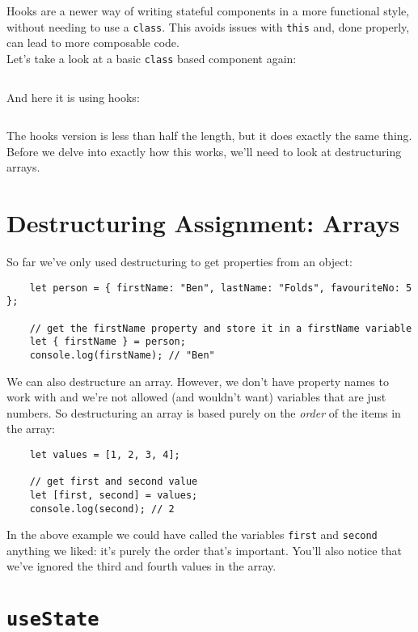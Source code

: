 Hooks are a newer way of writing stateful components in a more functional style, without needing to use a \texttt{class}. This avoids issues with \texttt{this} and, done properly, can lead to more composable code.
\\

Let's take a look at a basic \texttt{class} based component again:

\inputminted{js}{05-hooks/figures/01-class-component.js}

And here it is using hooks:

\inputminted{js}{05-hooks/figures/02-hooks.js}

The hooks version is less than half the length, but it does exactly the same thing.
\\

Before we delve into exactly how this works, we'll need to look at destructuring arrays.

\section{Destructuring Assignment: Arrays}
So far we've only used destructuring to get properties from an object:

\begin{verbatim}
    let person = { firstName: "Ben", lastName: "Folds", favouriteNo: 5 };

    // get the firstName property and store it in a firstName variable
    let { firstName } = person;
    console.log(firstName); // "Ben"
\end{verbatim}

We can also destructure an array. However, we don't have property names to work with and we're not allowed (and wouldn't want) variables that are just numbers. So destructuring an array is based purely on the \textit{order} of the items in the array:

\begin{verbatim}
    let values = [1, 2, 3, 4];

    // get first and second value
    let [first, second] = values;
    console.log(second); // 2
\end{verbatim}

In the above example we could have called the variables \texttt{first} and \texttt{second} anything we liked: it's purely the order that's important. You'll also notice that we've ignored the third and fourth values in the array.


\section{\texttt{useState}}

